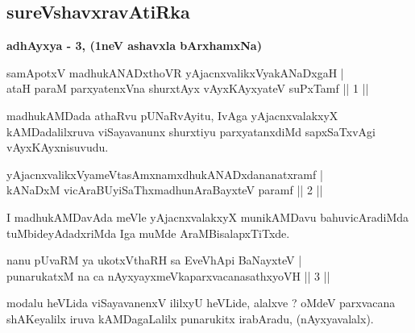 \begin{center}
\section*{sureVshavxravAtiRka}
{\Large\textbf{adhAyxya - 3,  (1neV ashavxla bArxhamxNa)}}
\medskip
\end{center}


\begin{shl}
samApotxV madhukANADxthoVR yAjacnxvalikxVyakANaDxgaH |\\
ataH paraM parxyatenxVna shurxtAyx vAyxKAyxyateV suPxTamf \hfill || 1 || 
\end{shl}

\begin{artha}
madhukAMDada athaRvu pUNaRvAyitu, IvAga yAjacnxvalakxyX kAMDadalilxruva viSayavanunx shurxtiyu parxyatanxdiMd sapxSaTxvAgi vAyxKAyxnisuvudu.
\end{artha}


\begin{shl}
yAjacnxvalikxVyameVtasAmxnamxdhukANADxdananatxramf |\\
kANaDxM vicAraBUyiSaThxmadhunA\s \s raBayxteV paramf \hfill || 2 ||
\end{shl}

\begin{artha}
I madhukAMDavAda meVle yAjacnxvalakxyX munikAMDavu bahuvicAradiMda tuMbideyAdadxriMda Iga muMde AraMBisalapxTiTxde.
\end{artha}



\begin{shl}
nanu pUvaRM ya ukotxV\s thaRH sa EveVhApi BaNayxteV |\\
punarukatxM na ca nAyxyayxmeVkaparxvacanasathxyoVH \hfill || 3 || 
\end{shl}

\begin{artha}
modalu heVLida viSayavanenxV ililxyU heVLide, alalxve ? oMdeV parxvacana shAKeyalilx iruva kAMDagaLalilx punarukitx irabAradu, (nAyxyavalalx).
\end{artha}

